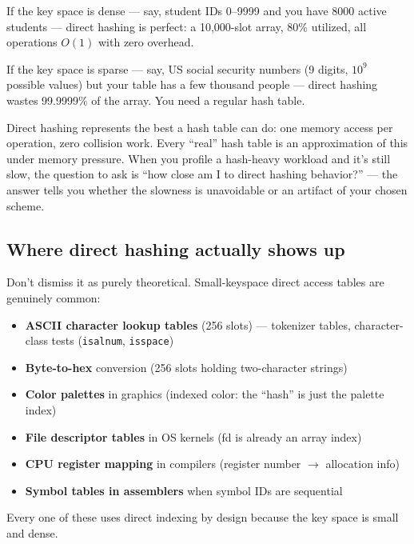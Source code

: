 \documentclass[11pt]{article}
\begin{document}
If the key space is dense --- say, student IDs 0--9999 and you
have 8000 active students --- direct hashing is perfect: a
10,000-slot array, 80\% utilized, all operations $O(1)$ with zero
overhead.

If the key space is sparse --- say, US social security numbers
(9 digits, $10^9$ possible values) but your table has a few
thousand people --- direct hashing wastes 99.9999\% of the array.
You need a regular hash table.

\begin{ideabox}
Direct hashing represents the best a hash table can do: one
memory access per operation, zero collision work. Every
``real'' hash table is an approximation of this under memory
pressure. When you profile a hash-heavy workload and it's still
slow, the question to ask is ``how close am I to direct hashing
behavior?'' --- the answer tells you whether the slowness is
unavoidable or an artifact of your chosen scheme.
\end{ideabox}

\subsection*{Where direct hashing actually shows up}

Don't dismiss it as purely theoretical. Small-keyspace direct
access tables are genuinely common:

\begin{itemize}[leftmargin=*]
    \item \textbf{ASCII character lookup tables} (256 slots) ---
          tokenizer tables, character-class tests
          (\texttt{isalnum}, \texttt{isspace})
    \item \textbf{Byte-to-hex} conversion (256 slots holding
          two-character strings)
    \item \textbf{Color palettes} in graphics (indexed color:
          the ``hash'' is just the palette index)
    \item \textbf{File descriptor tables} in OS kernels (fd is
          already an array index)
    \item \textbf{CPU register mapping} in compilers
          (register number $\to$ allocation info)
    \item \textbf{Symbol tables in assemblers} when symbol IDs
          are sequential
\end{itemize}

Every one of these uses direct indexing by design because the
key space is small and dense.
\end{document}
